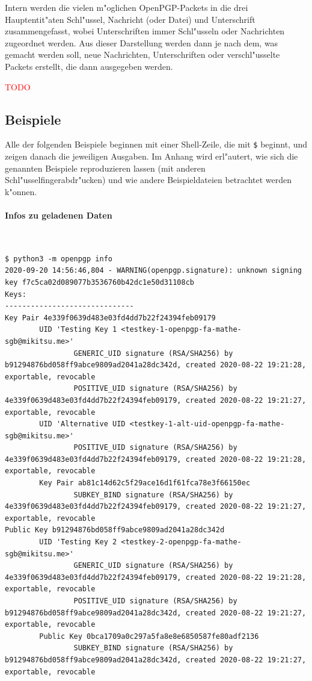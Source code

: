 \documentclass[12pt]{article}
\newcommand{\todo}[1]{\textcolor{red}{\mbox{TODO}}\marginpar{\textcolor{red}{#1}}}
\begin{document}
Intern werden die vielen m"oglichen OpenPGP-Packets in die drei Hauptentit"aten
Schl"ussel, Nachricht (oder Datei) und Unterschrift zusammengefasst,
wobei Unterschriften immer Schl"usseln oder Nachrichten zugeordnet werden.
Aus dieser Darstellung werden dann je nach dem, was gemacht werden soll,
neue Nachrichten, Unterschriften oder verschl"usselte Packets erstellt,
die dann ausgegeben werden.

\todo{Mehr schreiben}

\subsection{Beispiele}
Alle der folgenden Beispiele beginnen mit einer Shell-Zeile, die mit \verb|$| beginnt,
und zeigen danach die jeweiligen Ausgaben.
Im Anhang wird erl"autert, wie sich die genannten Beispiele reproduzieren lassen
(mit anderen Schl"usselfingerabdr"ucken) und wie andere Beispieldateien betrachtet werden k"onnen.

\lstset{
breaklines,
basicstyle=\scriptsize\ttfamily,
language=none,
}

\paragraph{Infos zu geladenen Daten}~
\begin{lstlisting}
$ python3 -m openpgp info
2020-09-20 14:56:46,804 - WARNING(openpgp.signature): unknown signing key f7c5ca02d089077b3536760b42dc1e50d31108cb
Keys:
------------------------------
Key Pair 4e339f0639d483e03fd4dd7b22f24394feb09179
        UID 'Testing Key 1 <testkey-1-openpgp-fa-mathe-sgb@mikitsu.me>'
                GENERIC_UID signature (RSA/SHA256) by b91294876bd058ff9abce9809ad2041a28dc342d, created 2020-08-22 19:21:28, exportable, revocable
                POSITIVE_UID signature (RSA/SHA256) by 4e339f0639d483e03fd4dd7b22f24394feb09179, created 2020-08-22 19:21:27, exportable, revocable
        UID 'Alternative UID <testkey-1-alt-uid-openpgp-fa-mathe-sgb@mikitsu.me>'
                POSITIVE_UID signature (RSA/SHA256) by 4e339f0639d483e03fd4dd7b22f24394feb09179, created 2020-08-22 19:21:28, exportable, revocable
        Key Pair ab81c14d62c5f29ace16d1f61fca78e3f66150ec
                SUBKEY_BIND signature (RSA/SHA256) by 4e339f0639d483e03fd4dd7b22f24394feb09179, created 2020-08-22 19:21:27, exportable, revocable
Public Key b91294876bd058ff9abce9809ad2041a28dc342d
        UID 'Testing Key 2 <testkey-2-openpgp-fa-mathe-sgb@mikitsu.me>'
                GENERIC_UID signature (RSA/SHA256) by 4e339f0639d483e03fd4dd7b22f24394feb09179, created 2020-08-22 19:21:28, exportable, revocable
                POSITIVE_UID signature (RSA/SHA256) by b91294876bd058ff9abce9809ad2041a28dc342d, created 2020-08-22 19:21:27, exportable, revocable
        Public Key 0bca1709a0c297a5fa8e8e6850587fe80adf2136
                SUBKEY_BIND signature (RSA/SHA256) by b91294876bd058ff9abce9809ad2041a28dc342d, created 2020-08-22 19:21:27, exportable, revocable
\end{lstlisting}
\end{document}
